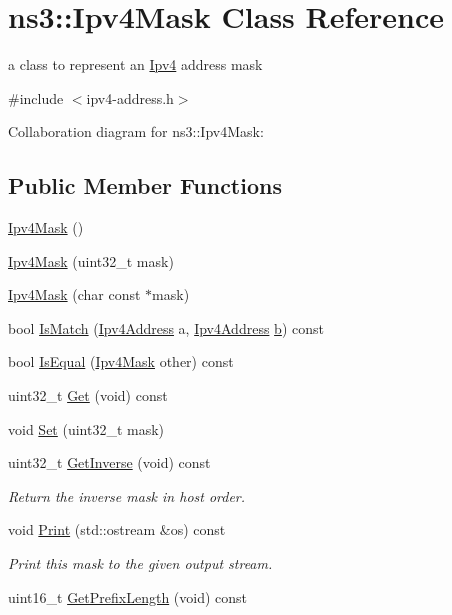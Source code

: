 \hypertarget{classns3_1_1Ipv4Mask}{}\section{ns3\+:\+:Ipv4\+Mask Class Reference}
\label{classns3_1_1Ipv4Mask}


a class to represent an \hyperlink{classns3_1_1Ipv4}{Ipv4} address mask  




{\ttfamily \#include $<$ipv4-\/address.\+h$>$}



Collaboration diagram for ns3\+:\+:Ipv4\+Mask\+:
\subsection*{Public Member Functions}
\begin{DoxyCompactItemize}
\item 
\hyperlink{classns3_1_1Ipv4Mask_a4f877fcb3423f63debab168c83213627}{Ipv4\+Mask} ()
\item 
\hyperlink{classns3_1_1Ipv4Mask_a75acd45c3c66bdafd0d0dac4b827d901}{Ipv4\+Mask} (uint32\+\_\+t mask)
\item 
\hyperlink{classns3_1_1Ipv4Mask_abac70ca1bc2899c0519e68d932e1e7fe}{Ipv4\+Mask} (char const $\ast$mask)
\item 
bool \hyperlink{classns3_1_1Ipv4Mask_a15aa7617a0cf896a917d494844e5b67c}{Is\+Match} (\hyperlink{classns3_1_1Ipv4Address}{Ipv4\+Address} a, \hyperlink{classns3_1_1Ipv4Address}{Ipv4\+Address} \hyperlink{lte__pathloss_8m_a21ad0bd836b90d08f4cf640b4c298e7c}{b}) const 
\item 
bool \hyperlink{classns3_1_1Ipv4Mask_a1428fba537359418d0b7d8c84a135a7e}{Is\+Equal} (\hyperlink{classns3_1_1Ipv4Mask}{Ipv4\+Mask} other) const 
\item 
uint32\+\_\+t \hyperlink{classns3_1_1Ipv4Mask_ac557d10d9807bbc022ed64e2b929b2db}{Get} (void) const 
\item 
void \hyperlink{classns3_1_1Ipv4Mask_a33e4ed6fe734d4432bdf279c176975a2}{Set} (uint32\+\_\+t mask)
\item 
uint32\+\_\+t \hyperlink{classns3_1_1Ipv4Mask_a80eff325becf2f5d3b3ecd77e3ff33fd}{Get\+Inverse} (void) const 
\begin{DoxyCompactList}\small\item\em Return the inverse mask in host order. \end{DoxyCompactList}\item 
void \hyperlink{classns3_1_1Ipv4Mask_a4afcf0932364f41eb04e0c49c906a44e}{Print} (std\+::ostream \&os) const 
\begin{DoxyCompactList}\small\item\em Print this mask to the given output stream. \end{DoxyCompactList}\item 
uint16\+\_\+t \hyperlink{classns3_1_1Ipv4Mask_aed6cdc1658a130595f4acf33e33fcebe}{Get\+Prefix\+Length} (void) const 
\end{DoxyCompactItemize}
